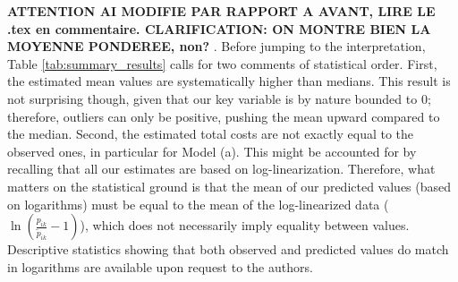 \documentclass[a4paper,11pt]{article}
\begin{document}

\textbf{ATTENTION AI MODIFIE PAR RAPPORT A AVANT, LIRE LE .tex en commentaire. CLARIFICATION: ON MONTRE BIEN LA MOYENNE PONDEREE, non? }.
Before jumping to the interpretation, Table \ref{tab:summary_results} calls for two comments of statistical order. First, the estimated mean values are systematically higher than medians. This result is not surprising though, given that our key variable is by nature bounded to 0; therefore, outliers can only be positive, pushing the mean upward compared to the median. Second, the estimated total costs are not exactly equal to the observed ones, in particular for Model (a). This might be accounted for by recalling that all our estimates are based on log-linearization. Therefore, what matters on the statistical ground is that the mean of our predicted values (based on logarithms) must be equal to the mean of the log-linearized data ($\ln\left(\frac{p_{ik}}{\widetilde{p}_{ik}}-1 \right)$), which does not necessarily imply equality between values.
Descriptive statistics showing that both observed and predicted values do match in logarithms are available upon request to the authors.
\end{document}
